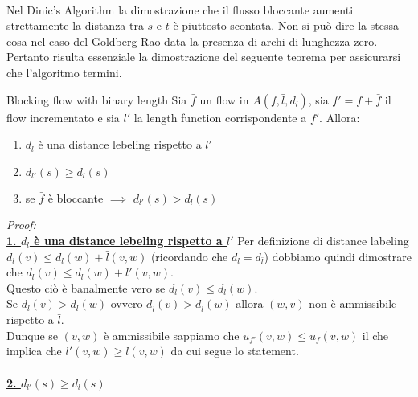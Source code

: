     \paragraph*{}Nel Dinic's Algorithm la dimostrazione che il flusso bloccante aumenti strettamente la distanza tra $s$ e $t$ è piuttosto scontata.
    Non si può dire la stessa cosa nel caso del Goldberg-Rao data la presenza di archi di lunghezza zero. Pertanto risulta essenziale la dimostrazione del seguente teorema per assicurarsi che l'algoritmo termini.
    \begin{theorem}{Blocking flow with binary length}{}
        Sia $\bar{f}$ un flow in $A(f,\bar{l}, d_l)$, sia $f' = f + \bar{f}$ il flow incrementato e sia 
        $l'$  la length function corrispondente a $f'$. Allora:
        \begin{enumerate}
            \item $d_l$ è una distance lebeling rispetto a $l'$
            \item $d_{l'}(s) \ge d_l(s)$
            \item  se $\bar{f}$ è bloccante $\implies$ $d_{l'}(s) > d_l(s)$
        \end{enumerate}
    \end{theorem}
    \textit{Proof:}\\
        \textbf{\underline{1. $d_l$ è una distance lebeling rispetto a $l'$}}
            Per definizione di distance labeling $d_l(v) \le d_l(w) + \bar{l}(v,w)$ (ricordando che $d_l = d_{\bar{l}}$) 
            dobbiamo quindi dimostrare che  $d_l(v) \le d_l(w) + l'(v,w)$.\\
            Questo ciò è banalmente vero se $d_l(v) \le d_l(w)$.\\
            Se $d_l(v) > d_l(w)$ ovvero $d_{\bar{l}}(v) > d_{\bar{l}}(w)$ allora $(w,v)$ non è ammissibile rispetto a $\bar{l}$.\\
            Dunque se $(v,w)$ è ammissibile sappiamo che $u_{f'}(v,w)\le u_{f}(v,w)$ il che implica che \colorbox{yellow!40!white}{$l'(v,w)\ge \bar{l}(v,w)$} da cui segue lo statement.

            \paragraph*{\underline{2. $d_{l'}(s) \ge d_l(s)$}}

